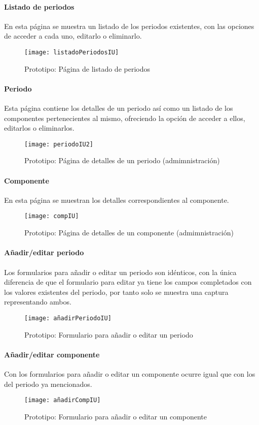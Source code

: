 \paragraph*{Listado de periodos}
En esta página se muestra un listado de los periodos existentes, con las opciones de acceder a cada uno, editarlo o eliminarlo.
\begin{figure}[H]
\centering
\texttt{[image: listadoPeriodosIU]}
\caption{Prototipo: Página de listado de periodos}
\end{figure}
\paragraph*{Periodo}
Esta página contiene los detalles de un periodo así como un listado de los componentes pertenecientes al mismo, ofreciendo la opción de acceder a ellos, editarlos o eliminarlos.
\begin{figure}[H]
\centering
\texttt{[image: periodoIU2]}
\caption{Prototipo: Página de detalles de un periodo (admimnistración)}
\end{figure}
\paragraph*{Componente}
En esta página se muestran los detalles correspondientes al componente.
\begin{figure}[H]
\centering
\texttt{[image: compIU]}
\caption{Prototipo: Página de detalles de un componente (admimnistración)}
\end{figure}
\paragraph*{Añadir/editar periodo}
Los formularios para añadir o editar un periodo son idénticos, con la única diferencia de que el formulario para editar ya tiene los campos completados con los valores existentes del periodo, por tanto solo se muestra una captura representando ambos.
\begin{figure}[H]
\centering
\texttt{[image: añadirPeriodoIU]}
\caption{Prototipo: Formulario para añadir o editar un periodo}
\end{figure}
\paragraph*{Añadir/editar componente}
Con los formularios para añadir o editar un componente ocurre igual que con los del periodo ya mencionados.
\begin{figure}[H]
\centering
\texttt{[image: añadirCompIU]}
\caption{Prototipo: Formulario para añadir o editar un componente}
\end{figure}



